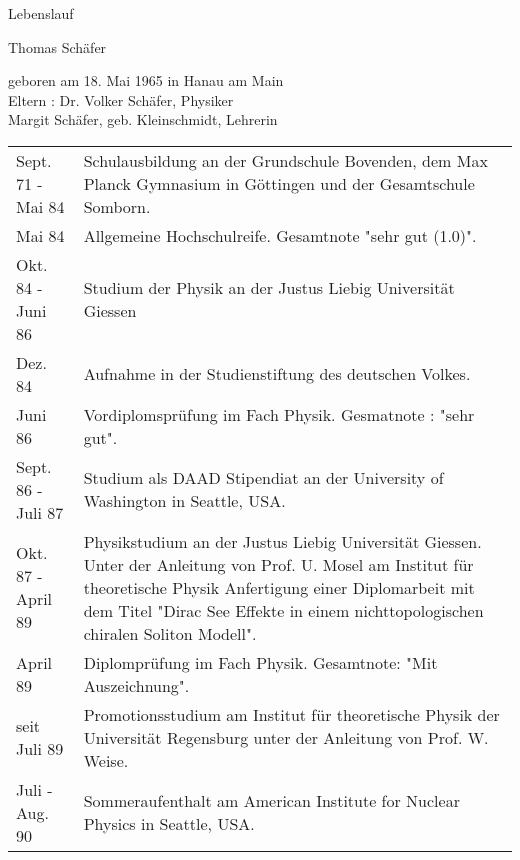 \pagestyle{empty}
\hoffset-1.5cm
\textwidth15cm

\vspace{1cm}
\centerline{\huge \rm Lebenslauf}
\vspace{0.8cm}
\centerline{\Large \rm Thomas Sch\"afer}
\vspace{0.8cm}
\begin{center}
\begin{minipage}{8cm}
geboren am 18. Mai 1965 in Hanau am Main \\
Eltern : Dr. Volker Sch\"afer, Physiker \\
Margit Sch\"afer, geb. Kleinschmidt, Lehrerin
\end{minipage}
\end{center}

\vspace{2cm}
\begin{tabular}{lp{11cm}}
Sept. 71 - Mai 84     &  Schulausbildung an der Grundschule Bovenden, dem 
                         Max Planck Gymnasium in G\"ottingen und der 
			 Gesamtschule Somborn. \\
Mai 84                &  Allgemeine Hochschulreife. Gesamtnote
                         "sehr gut (1.0)". \\			  
Okt. 84 - Juni 86     &  Studium der Physik an der Justus Liebig Universit\"at
                         Giessen\\
Dez. 84               &  Aufnahme in der Studienstiftung des deutschen Volkes.\\		 
Juni 86               &  Vordiplomspr\"ufung im Fach Physik. Gesmatnote :
                         "sehr gut". \\ 			 
Sept. 86 - Juli 87    &  Studium als DAAD Stipendiat an der University of
                         Washington in Seattle, USA. \\
Okt. 87 - April 89    &  Physikstudium an der Justus Liebig Universit\"at
                         Giessen. Unter der Anleitung von Prof. U. Mosel am
		         Institut f\"ur theoretische Physik Anfertigung
			 einer Diplomarbeit mit dem Titel "Dirac See Effekte
		         in einem nichttopologischen chiralen  Soliton Modell".\\
April 89              &  Diplompr\"ufung im Fach Physik. Gesamtnote: 
                         "Mit Auszeichnung". \\			 
seit Juli 89          &  Promotionsstudium am Institut f\"ur theoretische 
                         Physik der Universit\"at Regensburg unter der
			 Anleitung von Prof. W. Weise. \\ 
Juli - Aug. 90        &  Sommeraufenthalt am American Institute for Nuclear
                         Physics in Seattle, USA.			 
\end{tabular}

